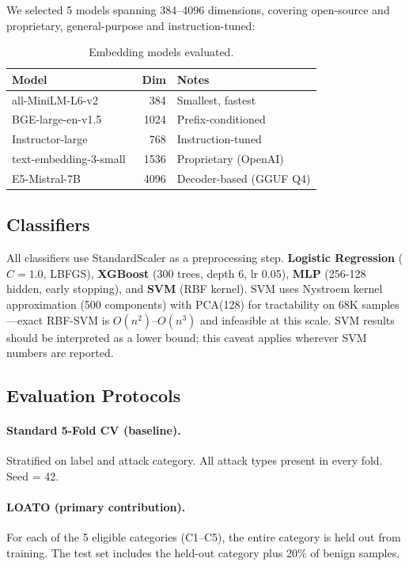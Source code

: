 \documentclass[11pt,a4paper]{article}
\begin{document}
We selected 5 models spanning 384--4096 dimensions, covering open-source and
proprietary, general-purpose and instruction-tuned:

\begin{table}[t]
\centering
\small
\caption{Embedding models evaluated.}
\label{tab:embeddings}
\begin{tabular}{lrl}
\toprule
\textbf{Model} & \textbf{Dim} & \textbf{Notes} \\
\midrule
all-MiniLM-L6-v2~\citep{reimers2019sentencebert} & 384 & Smallest, fastest \\
BGE-large-en-v1.5~\citep{xiao2023cpack} & 1024 & Prefix-conditioned \\
Instructor-large~\citep{su2023instructor} & 768 & Instruction-tuned \\
text-embedding-3-small~\citep{openai2024embeddings} & 1536 & Proprietary (OpenAI) \\
E5-Mistral-7B~\citep{wang2024e5mistral} & 4096 & Decoder-based (GGUF Q4) \\
\bottomrule
\end{tabular}
\end{table}

\subsection{Classifiers}

All classifiers use StandardScaler as a preprocessing step.
\textbf{Logistic Regression} ($C{=}1.0$, LBFGS),
\textbf{XGBoost} (300 trees, depth 6, lr 0.05),
\textbf{MLP} (256-128 hidden, early stopping), and
\textbf{SVM} (RBF kernel).
SVM uses Nystroem kernel approximation (500 components) with PCA(128) for
tractability on 68K samples---exact RBF-SVM is $O(n^2)$--$O(n^3)$ and
infeasible at this scale. SVM results should be interpreted as a lower bound;
this caveat applies wherever SVM numbers are reported.

\subsection{Evaluation Protocols}

\paragraph{Standard 5-Fold CV (baseline).}
Stratified on label and attack category. All attack types present in every fold.
Seed = 42.

\paragraph{LOATO (primary contribution).}
For each of the 5 eligible categories (C1--C5), the entire category is held out
from training. The test set includes the held-out category plus 20\% of benign
samples.
\end{document}
